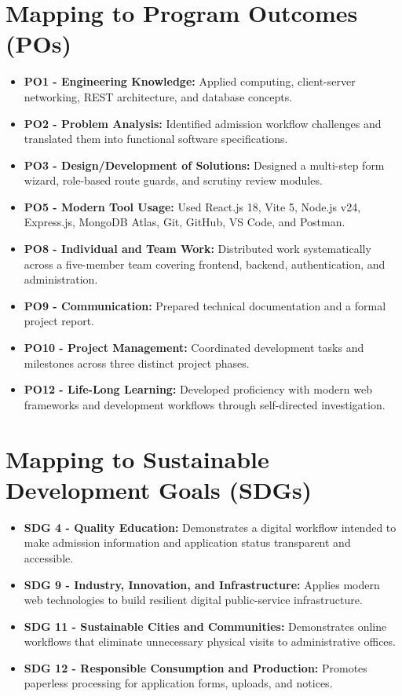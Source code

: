 \documentclass[12pt,a4paper,oneside]{report}
\begin{document}
\section{Mapping to Program Outcomes (POs)}
\begin{itemize}
    \item \textbf{PO1 - Engineering Knowledge:} Applied computing, client-server networking, REST architecture, and database concepts.
    \item \textbf{PO2 - Problem Analysis:} Identified admission workflow challenges and translated them into functional software specifications.
    \item \textbf{PO3 - Design/Development of Solutions:} Designed a multi-step form wizard, role-based route guards, and scrutiny review modules.
    \item \textbf{PO5 - Modern Tool Usage:} Used React.js 18, Vite 5, Node.js v24, Express.js, MongoDB Atlas, Git, GitHub, VS Code, and Postman.
    \item \textbf{PO8 - Individual and Team Work:} Distributed work systematically across a five-member team covering frontend, backend, authentication, and administration.
    \item \textbf{PO9 - Communication:} Prepared technical documentation and a formal project report.
    \item \textbf{PO10 - Project Management:} Coordinated development tasks and milestones across three distinct project phases.
    \item \textbf{PO12 - Life-Long Learning:} Developed proficiency with modern web frameworks and development workflows through self-directed investigation.
\end{itemize}

\section{Mapping to Sustainable Development Goals (SDGs)}
\begin{itemize}
    \item \textbf{SDG 4 - Quality Education:} Demonstrates a digital workflow intended to make admission information and application status transparent and accessible.
    \item \textbf{SDG 9 - Industry, Innovation, and Infrastructure:} Applies modern web technologies to build resilient digital public-service infrastructure.
    \item \textbf{SDG 11 - Sustainable Cities and Communities:} Demonstrates online workflows that eliminate unnecessary physical visits to administrative offices.
    \item \textbf{SDG 12 - Responsible Consumption and Production:} Promotes paperless processing for application forms, uploads, and notices.
\end{itemize}
\end{document}
